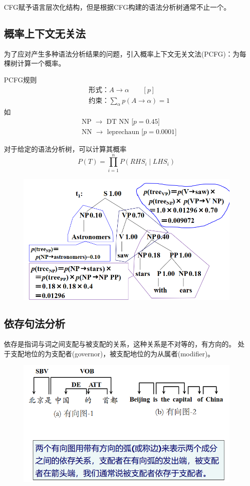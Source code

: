 CFG赋予语言层次化结构，但是根据CFG构建的语法分析树通常不止一个。

\subsection{概率上下文无关法}
为了应对产生多种语法分析结果的问题，引入概率上下文无关文法(PCFG)：为每棵树计算一个概率。

PCFG规则
\[\begin{aligned}
&\text{形式：}A\to\alpha\qquad [p]\\
&\text{约束：}\sum_\alpha p(A\to\alpha)=1
\end{aligned}\]
如
\[\begin{aligned}
&\text{NP $\to$ DT NN [$p=0.45$]}\\
&\text{NN $\to$ leprechaun [$p=0.0001$]}
\end{aligned}\]

对于给定的语法分析树，可以计算其概率
\[P(T)=\prod_{i=1}^nP(RHS_i\mid LHS_i)\]
\begin{figure}[H]
\centering
\includegraphics[width=0.6\linewidth]{fig/PCFG.png}
\end{figure}

\subsection{依存句法分析}
\begin{definition}[依存]
依存是指词与词之间支配与被支配的关系，这种关系是不对等的，有方向的。
处于支配地位的为支配者(governor)，被支配地位的为从属者(modifier)。
\end{definition}
\begin{figure}[H]
\centering
\includegraphics[width=0.6\linewidth]{fig/dependency_parser.png}
\end{figure}


